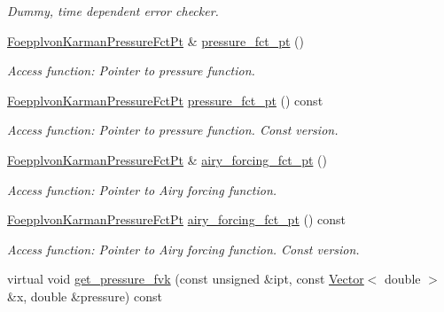 \begin{DoxyCompactItemize}
\begin{DoxyCompactList}\small\item\em Dummy, time dependent error checker. \end{DoxyCompactList}\item 
\hyperlink{classoomph_1_1FoepplvonKarmanEquations_a39b64f9712ec34f455beb9f4271ff297}{Foepplvon\+Karman\+Pressure\+Fct\+Pt} \& \hyperlink{classoomph_1_1FoepplvonKarmanEquations_a4c7831db80aadea95444bacfee56eb28}{pressure\+\_\+fct\+\_\+pt} ()
\begin{DoxyCompactList}\small\item\em Access function\+: Pointer to pressure function. \end{DoxyCompactList}\item 
\hyperlink{classoomph_1_1FoepplvonKarmanEquations_a39b64f9712ec34f455beb9f4271ff297}{Foepplvon\+Karman\+Pressure\+Fct\+Pt} \hyperlink{classoomph_1_1FoepplvonKarmanEquations_a1a297b4c850ac603c4bdb4f3a4e9fe72}{pressure\+\_\+fct\+\_\+pt} () const
\begin{DoxyCompactList}\small\item\em Access function\+: Pointer to pressure function. Const version. \end{DoxyCompactList}\item 
\hyperlink{classoomph_1_1FoepplvonKarmanEquations_a39b64f9712ec34f455beb9f4271ff297}{Foepplvon\+Karman\+Pressure\+Fct\+Pt} \& \hyperlink{classoomph_1_1FoepplvonKarmanEquations_a9eac8c0d991ce23a846c89c07f82b649}{airy\+\_\+forcing\+\_\+fct\+\_\+pt} ()
\begin{DoxyCompactList}\small\item\em Access function\+: Pointer to Airy forcing function. \end{DoxyCompactList}\item 
\hyperlink{classoomph_1_1FoepplvonKarmanEquations_a39b64f9712ec34f455beb9f4271ff297}{Foepplvon\+Karman\+Pressure\+Fct\+Pt} \hyperlink{classoomph_1_1FoepplvonKarmanEquations_a35fc7a18b13fb4a2ff5290bd511f7fac}{airy\+\_\+forcing\+\_\+fct\+\_\+pt} () const
\begin{DoxyCompactList}\small\item\em Access function\+: Pointer to Airy forcing function. Const version. \end{DoxyCompactList}\item 
virtual void \hyperlink{classoomph_1_1FoepplvonKarmanEquations_a853fb95081108ca7ac59d98677926cab}{get\+\_\+pressure\+\_\+fvk} (const unsigned \&ipt, const \hyperlink{classoomph_1_1Vector}{Vector}$<$ double $>$ \&x, double \&pressure) const

\end{DoxyCompactItemize}
